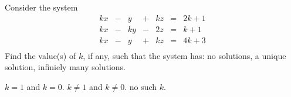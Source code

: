 
\begin{Exercise}[name={},
title={}, 
origin={\cite{BS}},
counter=Exercise]
Consider the system
\[
\begin{array}{rrrrrrrr}
kx & - & y  & + & kz & =& 2k+1\\
kx & - & ky & - & 2z & =&  k+1\\
kx & - & y  & + & kz & =&  4k+3\\
\end{array}
\]
Find the value(s) of $k$, if any, such that the system has:
\Question no solutions,
\Question a unique solution, 
\Question infiniely many solutions.
\end{Exercise}

\begin{Answer}
\begin{multicols}{2}
\Question $k= 1$ and $k= 0$.
\Question $k\neq 1$ and $k\neq 0$.
\Question no such $k$.
\EndCurrentQuestion
\end{multicols}
\end{Answer}

